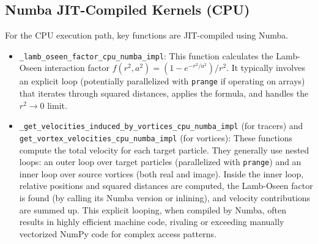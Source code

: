 \documentclass[12pt,letterpaper]{article}
\begin{document}
\subsection{Numba JIT-Compiled Kernels (CPU)}
For the CPU execution path, key functions are JIT-compiled using Numba.
\begin{itemize}
    \item \texttt{\_lamb\_oseen\_factor\_cpu\_numba\_impl}: This function calculates the Lamb-Oseen interaction factor $f(r^2, a^2) = (1 - e^{-r^2/a^2})/r^2$. It typically involves an explicit loop (potentially parallelized with \texttt{prange} if operating on arrays) that iterates through squared distances, applies the formula, and handles the $r^2 \to 0$ limit.
    \item \texttt{\_get\_velocities\_induced\_by\_vortices\_cpu\_numba\_impl} (for tracers) and \\ \texttt{get\_vortex\_velocities\_cpu\_numba\_impl} (for vortices): These functions compute the total velocity for each target particle.
    They generally use nested loops: an outer loop over target particles (parallelized with \texttt{prange}) and an inner loop over source vortices (both real and image). Inside the inner loop, relative positions and squared distances are computed, the Lamb-Oseen factor is found (by calling its Numba version or inlining), and velocity contributions are summed up. This explicit looping, when compiled by Numba, often results in highly efficient machine code, rivaling or exceeding manually vectorized NumPy code for complex access patterns.
\end{itemize}
\end{document}
